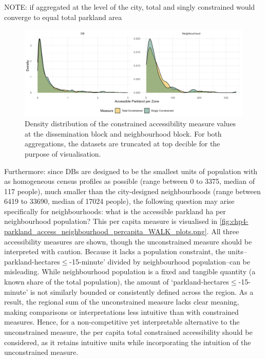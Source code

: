 \documentclass[
11pt, %
oneside, %
english, %
singlespacing, %
]{macthesis} %
\begin{document}
NOTE: if aggregated at the level of the city, total and singly constrained would converge to equal total parkland area

\begin{figure}

{\centering \includegraphics[width=6in]{./data/figures/chp4-dist_db_vs_neigh_plots} 

}

\caption{\label{fig:chp4-dist_db_vs_neigh_plots}Density distribution of the constrained accessibility measure values at the dissemination block and neighbourhood block. For both aggregations, the datasets are truncated at top decible for the purpose of visualisation.}\label{fig:unnamed-chunk-60}
\end{figure}

Furthermore: since DBs are designed to be the smallest units of population with as homogeneous census profiles as possible (range between 0 to 3375, median of 117 people), much smaller than the city-designed neighbourhoods (range between 6419 to 33690, median of 17024 people), the following question may arise specifically for neighbourhoods: what is the accessible parkland ha per neighbourhood population? This per capita measure is visualised in \ref{fig:chp4-parkland_access_neighbourhood_percapita_WALK_plots.png}. All three accessibility measures are shown, though the unconstrained measure should be interpreted with caution. Because it lacks a population constraint, the units--parkland-hectares\(\le\)-15-minute' divided by neighbourhood population--can be misleading. While neighbourhood population is a fixed and tangible quantity (a known share of the total population), the amount of `parkland-hectares\(\le\)-15-minute' is not similarly bounded or consistently defined across the region. As a result, the regional sum of the unconstrained measure lacks clear meaning, making comparisons or interpretations less intuitive than with constrained measures. Hence, for a non-competitive yet interpretable alternative to the unconstrained measure, the per capita total constrained accessibility should be considered, as it retains intuitive units while incorporating the intuition of the unconstrained measure.
\end{document}
